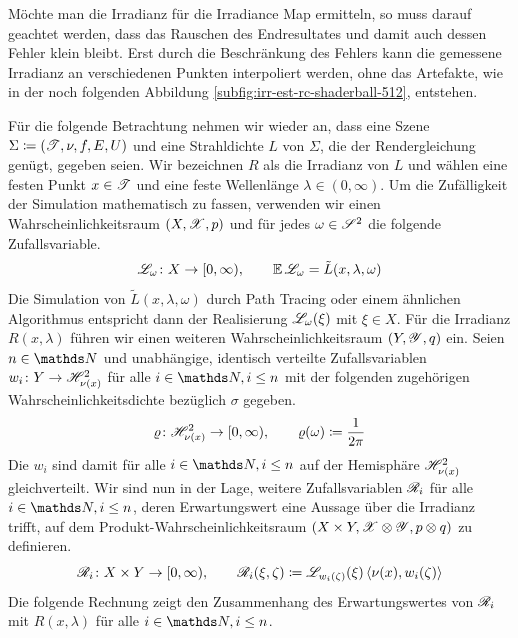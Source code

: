 		Möchte man die Irradianz für die Irradiance Map ermitteln, so muss darauf geachtet werden, dass das Rauschen des Endresultates und damit auch dessen Fehler klein bleibt.
		Erst durch die Beschränkung des Fehlers kann die gemessene Irradianz an verschiedenen Punkten interpoliert werden, ohne das Artefakte, wie in der noch folgenden Abbildung \ref{subfig:irr-est-rc-shaderball-512}, entstehen.

		Für die folgende Betrachtung nehmen wir wieder an, dass eine Szene $\Sigma\coloneqq(\mathscr{T},\nu,f,E,U)$ und eine Strahldichte $L$ von $\Sigma$, die der Rendergleichung genügt, gegeben seien.
		Wir bezeichnen $R$ als die Irradianz von $L$ und wählen eine festen Punkt $x\in\mathscr{T}$ und eine feste Wellenlänge $\lambda\in(0,\infty)$.
		Um die Zufälligkeit der Simulation mathematisch zu fassen, verwenden wir einen Wahrscheinlichkeitsraum $(X,\mathscr{X},p)$ und für jedes $\omega\in\mathscr{S}^{2}$ die folgende Zufallsvariable.
		\[
			\mathscr{L}_\omega\colon X\to[0,\infty),\qquad \operatorname{\mathbb{E}}\mathscr{L}_\omega = \tilde{L}(x,\lambda,\omega)
		\]
		Die Simulation von $\tilde{L}(x,\lambda,\omega)$ durch Path Tracing oder einem ähnlichen Algorithmus entspricht dann der Realisierung $\mathscr{L}_\omega(\xi)$ mit $\xi\in X$.
		Für die Irradianz $R(x,\lambda)$ führen wir einen weiteren Wahrscheinlichkeitsraum $(Y,\mathscr{Y},q)$ ein.
		Seien $n\in\SN$ und unabhängige, identisch verteilte Zufallsvariablen $w_i\colon Y\to\mathscr{H}^{2}_{\nu(x)}$ für alle $i\in\SN,i\leq n$ mit der folgenden zugehörigen Wahrscheinlichkeitsdichte bezüglich $\sigma$ gegeben.
		\[
			\varrho\colon\mathscr{H}^{2}_{\nu(x)}\to[0,\infty),\qquad \varrho(\omega)\coloneqq\frac{1}{2\pi}
		\]
		Die $w_i$ sind damit für alle $i\in\SN,i\leq n$ auf der Hemisphäre $\mathscr{H}^{2}_{\nu(x)}$ gleichverteilt.
		Wir sind nun in der Lage, weitere Zufallsvariablen $\mathscr{R}_i$ für alle $i\in\SN,i\leq n$, deren Erwartungswert eine Aussage über die Irradianz trifft, auf dem Produkt-Wahrscheinlichkeitsraum $(X\times Y,\mathscr{X}\otimes\mathscr{Y}, p\otimes q)$ zu definieren.
		\[
			\mathscr{R}_i\colon X\times Y\to[0,\infty),\qquad \mathscr{R}_i(\xi,\zeta)\coloneqq \mathscr{L}_{w_i(\zeta)}(\xi) \left\langle \nu(x),w_i(\zeta) \right\rangle
		\]
		Die folgende Rechnung zeigt den Zusammenhang des Erwartungswertes von $\mathscr{R}_i$ mit $R(x,\lambda)$ für alle $i\in\SN,i\leq n$.
